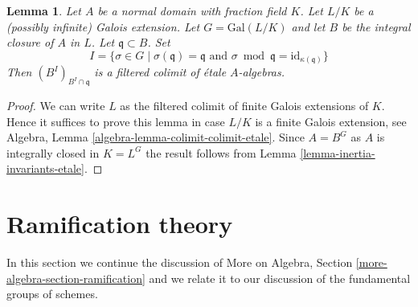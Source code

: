 \documentclass{stacks-project}
\theoremstyle{plain}
\newtheorem{lemma}[subsection]{Lemma}
\theoremstyle{definition}
\theoremstyle{remark}
\numberwithin{equation}{subsection}
\begin{document}
\begin{lemma}
\label{lemma-inertial-invariants-unramified}
Let $A$ be a normal domain with fraction field $K$.
Let $L/K$ be a (possibly infinite) Galois extension.
Let $G = \text{Gal}(L/K)$ and let
$B$ be the integral closure of $A$ in $L$.
Let $\mathfrak q \subset B$. Set
$$
I = \{\sigma \in G \mid
\sigma(\mathfrak q) = \mathfrak q \text{ and }
\sigma \bmod \mathfrak q = \text{id}_{\kappa(\mathfrak q)}\}
$$
Then $(B^I)_{B^I \cap \mathfrak q}$ is a filtered colimit
of \'etale $A$-algebras.
\end{lemma}

\begin{proof}
We can write $L$ as the filtered colimit of finite Galois extensions
of $K$. Hence it suffices to prove this lemma in case $L/K$ is
a finite Galois extension, see
Algebra, Lemma \ref{algebra-lemma-colimit-colimit-etale}.
Since $A = B^G$ as $A$ is integrally
closed in $K = L^G$ the result follows from
Lemma \ref{lemma-inertia-invariants-etale}.
\end{proof}







\section{Ramification theory}
\label{section-ramification}

\noindent
In this section we continue the discussion of
More on Algebra, Section \ref{more-algebra-section-ramification}
and we relate it to our discussion of the fundamental groups of schemes.
\end{document}
